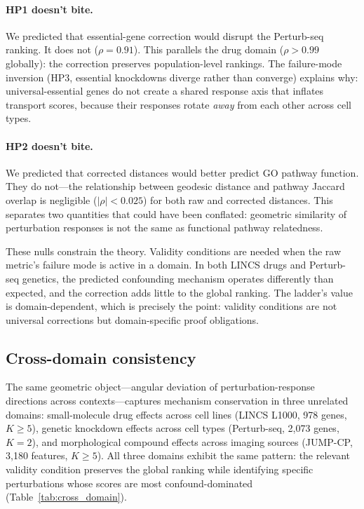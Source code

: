 \documentclass{article}
\begin{document}
\paragraph{HP1 doesn't bite.}
We predicted that essential-gene correction would disrupt the Perturb-seq
ranking. It does not ($\rho = 0.91$). This parallels the drug domain ($\rho
> 0.99$ globally): the correction preserves population-level rankings. The
failure-mode inversion
(HP3, essential knockdowns diverge rather than converge) explains why:
universal-essential genes do not create a shared response axis that inflates
transport scores, because their responses rotate \emph{away} from each other
across cell types.

\paragraph{HP2 doesn't bite.}
We predicted that corrected distances would better predict GO pathway
function. They do not---the relationship between geodesic distance and
pathway Jaccard overlap is negligible ($|\rho| < 0.025$) for both raw and
corrected distances. This separates two quantities that could have been
conflated: geometric similarity of perturbation responses is not the same as
functional pathway relatedness.

These nulls constrain the theory. Validity conditions are needed when the raw
metric's failure mode is active in a domain. In both LINCS drugs and
Perturb-seq genetics, the predicted confounding mechanism operates differently
than expected, and the correction adds little to the global ranking. The
ladder's value is domain-dependent, which is precisely the point: validity
conditions are not universal corrections but domain-specific proof obligations.

\subsection{Cross-domain consistency}

The same geometric object---angular deviation of perturbation-response
directions across contexts---captures mechanism conservation in three
unrelated domains: small-molecule drug effects across cell lines (LINCS
L1000, 978 genes, $K \geq 5$), genetic knockdown effects across
cell types (Perturb-seq, 2{,}073 genes, $K = 2$), and morphological
compound effects across imaging sources (JUMP-CP, 3{,}180 features,
$K \geq 5$). All three domains exhibit the same pattern: the relevant
validity condition preserves the global ranking while identifying specific
perturbations whose scores are most confound-dominated
(Table~\ref{tab:cross_domain}).
\end{document}
